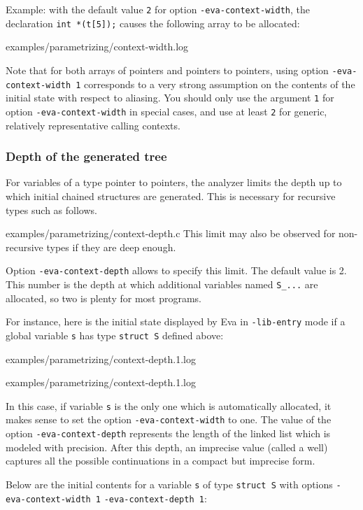 \documentclass[web]{frama-c-book}
\newcommand{\Eva}{\textsf{Eva}}
\begin{document}
Example: with the default value \lstinline|2| for option
\lstinline|-eva-context-width|, the declaration \lstinline|int *(t[5]);|
causes the following array to be allocated:

  {examples/parametrizing/context-width.log}
      
Note that for both arrays of pointers and pointers to pointers,
using option \lstinline|-eva-context-width 1| corresponds to a very strong
assumption on the contents of the initial state with respect to aliasing.
You should only use the argument \lstinline|1| for
option \lstinline|-eva-context-width| in special cases, and use at least 
\lstinline|2| for generic, relatively representative calling contexts.

\subsubsection{Depth of the generated tree}

For variables of a type pointer to pointers, the analyzer limits the depth up
to which initial chained structures are generated. 
This is necessary for recursive types such as follows.

  {examples/parametrizing/context-depth.c}
This limit may also be observed for non-recursive types if they are deep enough.

Option \lstinline|-eva-context-depth| allows to specify this limit.
The default value is 2. This number is the depth at which 
additional variables named \lstinline|S_...| are allocated, so
two is plenty for most programs.

For instance, here is the initial state displayed by \Eva{}
in \lstinline|-lib-entry| mode if a global variable \lstinline|s| 
has type \lstinline|struct S| defined above:

  {examples/parametrizing/context-depth.1.log}

  {examples/parametrizing/context-depth.1.log}

In this case, if variable \lstinline|s| is the only one which
is automatically allocated, it makes sense to set the option
\lstinline|-eva-context-width| to one.  The value of the
option \lstinline|-eva-context-depth| represents the length of the 
linked list which is modeled with precision. After this depth,
an imprecise value (called a well) captures all the possible continuations
in a compact but imprecise form.

Below are the initial contents for a variable \lstinline|s| of type \lstinline|struct S|
with options \lstinline|-eva-context-width 1|
\lstinline|-eva-context-depth 1|:
\end{document}
